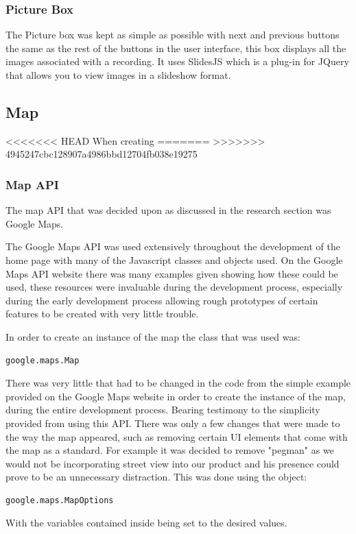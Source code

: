 \documentclass{l3proj}
\begin{document}
\subsubsection{Picture Box}
The Picture box was kept as simple as possible with next and previous
buttons the same as the rest of the buttons in the user interface,
this box displays all the images associated with a recording. It uses
SlidesJS which is a plug-in for JQuery that allows you to view images
in a slideshow format.



\subsection{Map}

<<<<<<< HEAD
When creating
=======
>>>>>>> 4945247cbc128907a4986bbd12704fb038e19275

\subsubsection{Map API}

The map API that was decided upon as discussed in the research section
was Google Maps.

The Google Maps API was used extensively throughout the development of
the home page with many of the Javascript classes and objects used. On
the Google Maps API website there was many examples given showing how
these could be used, these resources were invaluable during the
development process, especially during the early development process
allowing rough prototypes of certain features to be created with very
little trouble.

In order to create an instance of the map the class that was used was:
\begin{verbatim}
google.maps.Map
\end{verbatim}
There was very little that had to be changed in the code from the
simple example provided on the Google Maps website in order to create
the instance of the map, during the entire development
process. Bearing testimony to the simplicity provided from using this
API. There was only a few changes that were made to the way the map
appeared, such as removing certain UI elements that come with the map
as a standard. For example it was decided to remove "pegman" as we
would not be incorporating street view into our product and his
presence could prove to be an unnecessary distraction. This was done
using the object:
\begin{verbatim}
google.maps.MapOptions
\end{verbatim}
With the variables contained inside being set to the desired values.
\end{document}
